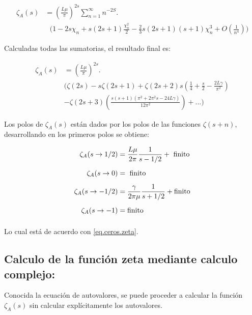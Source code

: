 \begin{align}
\zeta _{A} (s) &= 
\left( \frac{L \mu }{\pi} \right) ^{2s}
\sum _{n=1} ^{\infty}
  n  ^{-2 S} . \\[5pt]
& \ \  \ \Bigg(
	1 - 
	2 s \chi _n +  s(2s+1) \frac{\chi _n ^2}{2} - 
	\frac{2}{3} s(2s+1)(s+1) \chi _n ^3  + O \left( \frac{1}{n ^4} \right) \Bigg)
	\nonumber
\end{align}

Calculadas todas las sumatorias, el resultado final es:





\begin{equation}
\begin{aligned}
    \zeta _A (s) &= \left( \frac{L \mu }{\pi} \right) ^{2s} . \\[5pt]
	& \Bigg(
		\zeta ( 2 s ) -
		s \zeta ( 2s+1 ) +
		 \zeta (2s +2 ) s \left( \frac{1}{4} + \frac{s}{2} - \frac{2 L  \gamma}{\pi ^2} \right)  \\[5pt]
		 & - \zeta (2s+3) \left(  
							\frac{s(s+1) ( \pi ^2 + 2 \pi ^2 s - 24 L \gamma)}{12 \pi ^2 }
		 					\right) 
		+ ...
		\Bigg)
\end{aligned}
\end{equation}


Los polos de $\zeta _A (s)$ están dados por los polos de las funciones $\zeta (s+n)$, desarrollando en los primeros polos se obtiene:

\begin{equation}
\begin{aligned}
\zeta _A (s \rightarrow 1/2) &= 
\frac{L \mu }{2 \pi } \frac{1}{s-1/2} + \ {\rm finito} \\[5pt]
\zeta _A (s \rightarrow 0) &= \ {\rm finito} \\[5pt]
\zeta _A (s \rightarrow -1/2) &= \frac{\gamma}{2 \pi \mu } \frac{1}{s+1/2} 
	+ {\rm finito}\\[5pt]
\zeta _A (s \rightarrow -1) &=  {\rm finito} \\[5pt]
\end{aligned}
\end{equation}

Lo cual está de acuerdo con \ref{eq.ceros.zeta}.

\subsection{Calculo de la función zeta mediante calculo complejo:}

Conocida la ecuación de autovalores, se puede proceder a calcular la función $\zeta _A (s) $ sin calcular explícitamente los autovalores.

